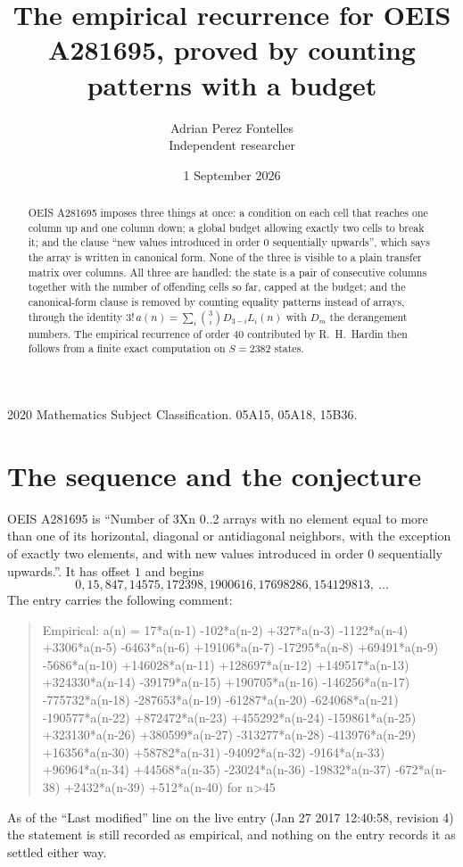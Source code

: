 \documentclass[11pt,a4paper]{article}
\title{The empirical recurrence for OEIS A281695, proved by counting patterns with a budget}
\author{Adrian Perez Fontelles\\ \small Independent researcher}
\date{1 September 2026}
\theoremstyle{plain}
\theoremstyle{definition}
\begin{document}
\maketitle

\begin{abstract}
OEIS A281695 imposes three things at once: a condition on each cell that reaches one column up and
one column down; a global budget allowing exactly two cells to
break it; and the clause ``new values introduced in order $0$ sequentially upwards'', which
says the array is written in canonical form. None of the three is visible to a plain transfer
matrix over columns. All three are handled: the state is a pair of consecutive columns
together with the number of offending cells so far, capped at the budget; and the
canonical-form clause is removed by counting equality patterns instead of arrays, through the
identity $3!\,a(n)=\sum_i\binom{3}{i}D_{3-i}L_i(n)$ with $D_m$ the derangement
numbers. The empirical recurrence of order $40$ contributed by R.~H.~Hardin then follows
from a finite exact computation on $S=2382$ states.
\end{abstract}

\noindent\small 2020 Mathematics Subject Classification. 05A15, 05A18, 15B36.\normalsize

\section{The sequence and the conjecture}

OEIS A281695 is ``Number of 3Xn 0..2 arrays with no element equal to more than one of its horizontal, diagonal or antidiagonal neighbors, with the exception of exactly two elements, and with new values introduced in order 0 sequentially upwards.''. It has offset $1$ and begins
\[
0, 15, 847, 14575, 172398, 1900616, 17698286, 154129813,\ \dots
\]
The entry carries the following comment:
\begin{quote}\small
Empirical: a(n) = 17*a(n-1) -102*a(n-2) +327*a(n-3) -1122*a(n-4) +3306*a(n-5) -6463*a(n-6) +19106*a(n-7) -17295*a(n-8) +69491*a(n-9) -5686*a(n-10) +146028*a(n-11) +128697*a(n-12) +149517*a(n-13) +324330*a(n-14) -39179*a(n-15) +190705*a(n-16) -146256*a(n-17) -775732*a(n-18) -287653*a(n-19) -61287*a(n-20) -624068*a(n-21) -190577*a(n-22) +872472*a(n-23) +455292*a(n-24) -159861*a(n-25) +323130*a(n-26) +380599*a(n-27) -313277*a(n-28) -413976*a(n-29) +16356*a(n-30) +58782*a(n-31) -94092*a(n-32) -9164*a(n-33) +96964*a(n-34) +44568*a(n-35) -23024*a(n-36) -19832*a(n-37) -672*a(n-38) +2432*a(n-39) +512*a(n-40) for n>45
\end{quote}
As of the ``Last modified'' line on the live entry (Jan 27 2017 12:40:58, revision 4) the statement is
still recorded as empirical, and nothing on the entry records it as settled either way.
\end{document}
